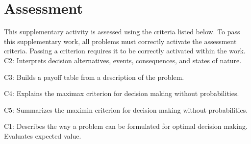 


	\section*{Assessment}
	This supplementary activity is assessed using the criteria listed below.
	To pass this supplementary work, all problems must correctly activate the assessment criteria.
	Passing a criterion requires it to be correctly activated within the work. \\
	C2: Interprets decision alternatives, events, consequences, and states of nature.\par
	C3: Builds a payoff table from a description of the problem.\par
	C4: Explains the maximax criterion for decision making without probabilities.\par
	C5: Summarizes the maximin criterion for decision making without probabilities.\par
	C1: Describes the way a problem can be formulated for optimal decision making. Evaluates expected value.\par

